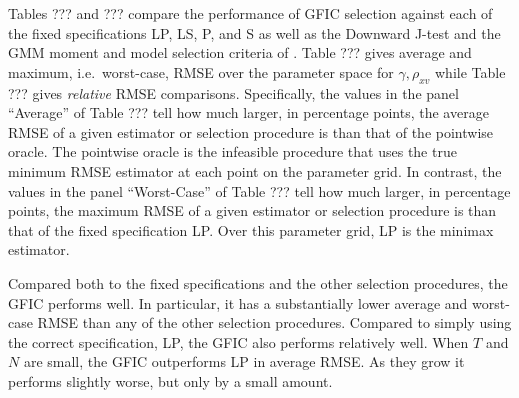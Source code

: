 Tables ??? and ??? compare the performance of GFIC selection against each of the fixed specifications LP, LS, P, and S as well as the Downward J-test and the GMM moment and model selection criteria of \cite{AndrewsLu}. 
Table ??? gives average and maximum, i.e.\ worst-case, RMSE over the parameter space for $\gamma, \rho_{xv}$ while Table ??? gives \emph{relative} RMSE comparisons. Specifically, the values in the panel ``Average'' of Table ??? tell how much larger, in percentage points, the average RMSE of a given estimator or selection procedure is than that of the pointwise oracle. 
The pointwise oracle is the infeasible procedure that uses the true minimum RMSE estimator at each point on the parameter grid. 
In contrast, the values in the panel ``Worst-Case'' of Table ??? tell how much larger, in percentage points, the maximum RMSE of a given estimator or selection procedure is than that of the fixed specification LP. 
Over this parameter grid, LP is the minimax estimator.

Compared both to the fixed specifications and the other selection procedures, the GFIC performs well. 
In particular, it has a substantially lower average and worst-case RMSE than any of the other selection procedures.
Compared to simply using the correct specification, LP, the GFIC also performs relatively well. 
When $T$ and $N$ are small, the GFIC outperforms LP in average RMSE. 
As they grow it performs slightly worse, but only by a small amount.


